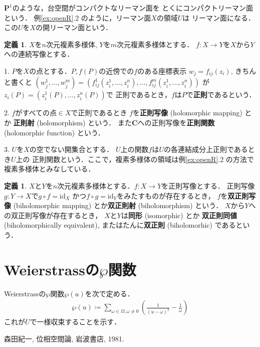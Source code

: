 \documentclass[11pt, a4paper, dvipdfmx]{jsarticle}
\theoremstyle{definition}
\newtheorem{Definition}[Axiom]{定義}
\newcommand{\cc}{\mathbf{C}}
\newcommand{\pp}{\mathbf{P}}
\newcommand{\id}{\mathrm{id}}
\theoremstyle{mystyle}
\numberwithin{equation}{section} %
\begin{document}
$\pp^1$のような，台空間がコンパクトなリーマン面を
とくにコンパクトリーマン面という．
例\ref{ex:openR}.2 のように，リーマン面$X$の領域$U$は
リーマン面になる．この$U$を$X$の開リーマン面という．

\begin{Definition}
    $X$を$n$次元複素多様体, $Y$を$m$次元複素多様体とする．
    $f\colon X\to Y$を$X$から$Y$への連続写像とする．
    
    1. 
    $P$を$X$の点とする．$P, f(P)$の近傍での$f$のある座標表示
    $w_j=f_{ij}(z_i)$, きちんと書くと
    $(w_{j}^{1},\dots,w_{j}^{m})
    =\left(f_{ij}^{1}(z_{i}^{1},\dots,z_{i}^{n}),\dots,f_{ij}^{m}(z_{i}^{1},\dots,z_{i}^{n})\right)$
    が$z_i(P)=(z_{i}^{1}(P),\dots,z_{i}^{n}(P))$で
    正則であるとき，$f$は$P$で\textbf{正則}であるという．
    
    2. 
    $f$がすべての点$\in X$で正則であるとき
    $f$を\textbf{正則写像} (holomorphic mapping) とか
    \textbf{正則射} (holomorphism) という．
    また$\cc$への正則写像を\textbf{正則関数} (holomorphic 
    function) という．

    3. 
    $U$を$X$の空でない開集合とする．
    $U$上の関数$f$は$U$の各連結成分上正則であるとき$U$上の
    正則関数という．ここで，複素多様体の領域は例\ref{ex:openR}.2 の方法で
    複素多様体とみなしている．
\end{Definition}

\begin{Definition}
    $X$と$Y$を$n$次元複素多様体とする．$f\colon X\to Y$を正則写像とする．
    正則写像$g\colon Y\to X$で$g\circ f=\id_X$
    かつ$f\circ g=\id_Y$をみたすものが存在するとき，
    $f$を\textbf{双正則写像} (biholomorphic mapping) とか\textbf{双正則射} (biholomorphism) という．
    $X$から$Y$への双正則写像が存在するとき，
    $X$と$Y$は\textbf{同形} (isomorphic) とか 
    \textbf{双正則同値} (biholomorphically equivalent), 
    またはたんに\textbf{双正則} (biholomorhic) であるという．
\end{Definition}

\section{Weierstrassの$\wp$関数}
Weierstrassの$\wp$関数$\wp(u)$を次で定める．
\begin{align}
    \wp(u)\coloneqq 
    \sum_{\omega\in\Omega,\omega\ne 0}\left(\frac{1}{(u-\omega)^2}-\frac{1}{\omega}\right)
\end{align}
これが$U$で一様収束することを示す．
\begin{thebibliography}{15}

 森田紀一, 位相空間論, 岩波書店, 1981. 

\end{thebibliography}
\end{document}
